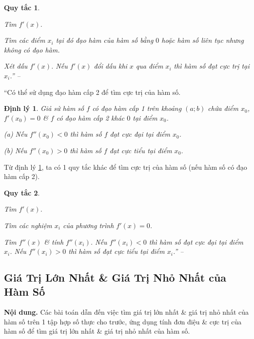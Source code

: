 \documentclass{article}
\numberwithin{equation}{section}
\newtheorem{quytac}{Quy tắc}
\newtheorem{dinhly}{Định lý}[section]
\begin{document}
\begin{quytac}
	\begin{enumerate*}
		\item Tìm $f'(x)$.
		\item Tìm các điểm $x_i$ tại đó đạo hàm của hàm số bằng $0$ hoặc hàm số liên tục nhưng không có đạo hàm.
		\item Xét dấu $f'(x)$. Nếu $f'(x)$ đổi dấu khi $x$ qua điểm $x_i$ thì hàm số đạt cực trị tại $x_i$.'' -- \cite[pp. 11--14]{SGK_Toan_12_giai_tich_nang_cao}
	\end{enumerate*}
\end{quytac}
``Có thể sử dụng đạo hàm cấp 2 để tìm cực trị của hàm số.

\begin{dinhly}
	\label{thm:dao ham cap 2 & cuc tri ham so}
	Giả sử hàm số $f$ có đạo hàm cấp 1 trên khoảng $(a;b)$ chứa điểm $x_0$, $f'(x_0) = 0$ \& $f$ có đạo hàm cấp 2 khác $0$ tại điểm $x_0$.
	\begin{enumerate*}
		\item[(a)] Nếu $f''(x_0) < 0$ thì hàm số $f$ đạt cực đại tại điểm $x_0$.
		\item[(b)] Nếu $f''(x_0) > 0$ thì hàm số $f$ đạt cực tiểu tại điểm $x_0$.
	\end{enumerate*}
\end{dinhly}
Từ định lý \ref{thm:dao ham cap 2 & cuc tri ham so}, ta có 1 quy tắc khác để tìm cực trị của hàm số (nếu hàm số có đạo hàm cấp 2).

\begin{quytac}
	\begin{enumerate*}
		\item Tìm $f'(x)$.
		\item Tìm các nghiệm $x_i$ của phương trình $f'(x) = 0$.
		\item Tìm $f''(x)$ \& tính $f''(x_i)$. Nếu $f''(x_i) < 0$ thì hàm số đạt cực đại tại điểm $x_i$. Nếu $f''(x_i) > 0$ thì hàm số đạt cực tiểu tại điểm $x_i$.'' -- \cite[pp. 15--16]{SGK_Toan_12_giai_tich_nang_cao}
	\end{enumerate*}
\end{quytac}


\subsection{Giá Trị Lớn Nhất \& Giá Trị Nhỏ Nhất của Hàm Số}
\textsf{\textbf{Nội dung.} Các bài toán dẫn đến việc tìm giá trị lớn nhất \& giá trị nhỏ nhất của hàm số trên 1 tập hợp số thực cho trước, ứng dụng tính đơn điệu \& cực trị của hàm số để tìm giá trị lớn nhất \& giá trị nhỏ nhất của hàm số.}
\end{document}
